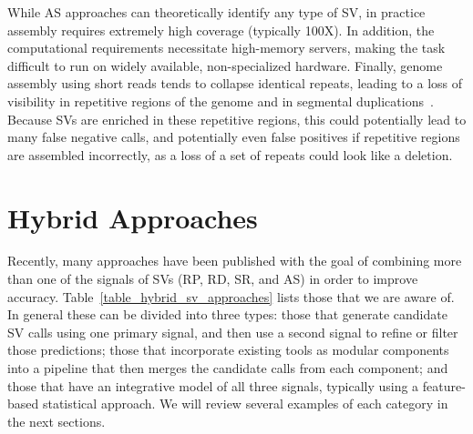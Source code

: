 While AS approaches can theoretically identify any type of SV, in practice assembly requires extremely high coverage (typically 100X). In addition, the computational requirements necessitate high-memory servers, making the task difficult to run on widely available, non-specialized hardware. Finally, genome assembly using short reads tends to collapse identical repeats, leading to a loss of visibility in repetitive regions of the genome and in segmental duplications~\cite{Alkan:2011hs}. Because SVs are enriched in these repetitive regions, this could potentially lead to many false negative calls, and potentially even false positives if repetitive regions are assembled incorrectly, as a loss of a set of repeats could look like a deletion. 

\section{Hybrid Approaches}\label{section_hybrid_approaches}

Recently, many approaches have been published with the goal of combining more than one of the signals of SVs (RP, RD, SR, and AS) in order to improve accuracy. Table~\ref{table_hybrid_sv_approaches} lists those that we are aware of. In general these can be divided into three types: those that generate candidate SV calls using one primary signal, and then use a second signal to refine or filter those predictions; those that incorporate existing tools as modular components into a pipeline that then merges the candidate calls from each component; and those that have an integrative model of all three signals, typically using a feature-based statistical approach. We will review several examples of each category in the next sections.

